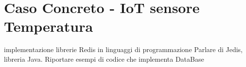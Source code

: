 \chapter{Caso Concreto - IoT sensore Temperatura}
implementazione librerie Redis in linguaggi di programmazione
Parlare di Jedis, libreria Java.
Riportare esempi di codice che implementa DataBase
